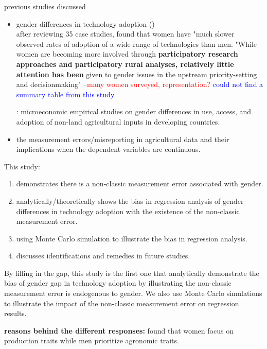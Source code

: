 \documentclass[12pt]{article}
\begin{document}
	   
	   
		previous studies discussed 
	\begin{itemize}

		\item gender differences in technology adoption (\cite{awotide2014assessing,apu2011effect}) \\
		after reviewing 35 case studies, \cite{ragasa2012gender} found that women have "much slower observed rates of adoption of a wide range of technologies than men. "While women are becoming more involved through\textbf{ participatory research approaches and participatory rural analyses, relatively little attention has been}	given to gender issues in the upstream priority-setting and decisionmaking" --\textcolor{red}{\how many women surveyed, representation? } \textcolor{blue}{could not find a summary table from this study}
		
		\cite{peterman2014review}: microeconomic empirical studies on gender differences in use, access, and adoption of non-land agricultural inputs in developing countries.
		\item the measurement errors/misreporting in agricultural data and their implications when the dependent variables are continuous.  
	\end{itemize}
	This study: 
	\begin{enumerate}
		\item demonstrates there is a non-classic measurement error associated with gender. 
		\item analytically/theoretically shows the bias in regression analysis of gender differences in technology adoption with the existence of the non-classic measurement error.
		\item using Monte Carlo simulation to illustrate the bias in regression analysis.
		\item discusses identifications and remedies in future studies.
	\end{enumerate}

	By filling in the gap, this study is the first one that analytically demonstrate the bias of gender gap in technology adoption by illustrating the non-classic measurement error is endogenous to gender. We also use Monte Carlo simulations to illustrate the impact of the non-classic measurement error on regression results. 
	 
\textbf{	 reasons behind the different responses:}
	\cite{teeken2021beyond} found that women focus on production traits while men prioritize agronomic traits. 
\end{document}
